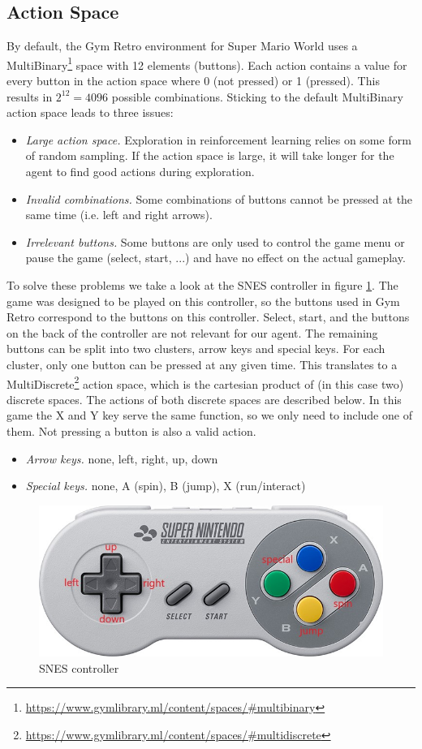 \documentclass{article}
\begin{document}
\subsection{Action Space}
By default, the Gym Retro environment for Super Mario World uses a MultiBinary\footnote{\url{https://www.gymlibrary.ml/content/spaces/\#multibinary}} space with 12 elements (buttons).
Each action contains a value for every button in the action space where 0 (not pressed) or 1 (pressed). This results in $2^{12}=4096$ possible combinations.
Sticking to the default MultiBinary action space leads to three issues:
\begin{itemize}
    \item \emph{Large action space.}
        Exploration in reinforcement learning relies on some form of random sampling.
        If the action space is large, it will take longer for the agent to find good actions during exploration.
    \item \emph{Invalid combinations.}
        Some combinations of buttons cannot be pressed at the same time (i.e. left and right arrows).
    \item \emph{Irrelevant buttons.} Some buttons are only used to control the game menu or pause the game (select, start, ...) and have no effect on the actual gameplay.
\end{itemize}
To solve these problems we take a look at the SNES controller in figure \ref{fig:snes-controller}.
The game was designed to be played on this controller, so the buttons used in Gym Retro correspond to the buttons on this controller.
Select, start, and the buttons on the back of the controller are not relevant for our agent.
The remaining buttons can be split into two clusters, arrow keys and special keys.
For each cluster, only one button can be pressed at any given time.
This translates to a MultiDiscrete\footnote{\url{https://www.gymlibrary.ml/content/spaces/\#multidiscrete}} action space, which is the cartesian product of (in this case two) discrete spaces.
The actions of both discrete spaces are described below.
In this game the X and Y key serve the same function, so we only need to include one of them.
Not pressing a button is also a valid action.
\begin{itemize}
    \item \emph{Arrow keys.} none, left, right, up, down
    \item \emph{Special keys.} none, A (spin), B (jump), X (run/interact)
\end{itemize}
\begin{figure}[ht]
    \centering
    \includegraphics[width=.75\textwidth]{snes-controller-annot}
    \caption{SNES controller}
    \label{fig:snes-controller}
\end{figure}
\end{document}
